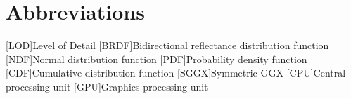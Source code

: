 \chapter*{Abbreviations}
\begin{acronym}[BRDF]
[LOD]{Level of Detail}
[BRDF]{Bidirectional reflectance distribution function}
[NDF]{Normal distribution function}
[PDF]{Probability density function}
[CDF]{Cumulative distribution function}
[SGGX]{Symmetric GGX}
[CPU]{Central processing unit}
[GPU]{Graphics processing unit}
\end{acronym}